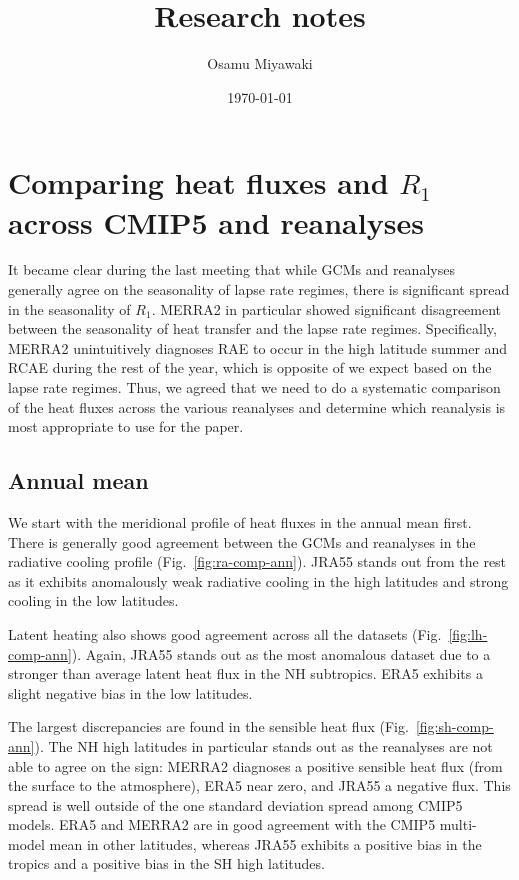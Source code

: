 \documentclass{article}
\title{Research notes}
\date{\today}
\author{Osamu Miyawaki}
\begin{document}
\maketitle

\section{Comparing heat fluxes and $R_1$ across CMIP5 and reanalyses}
It became clear during the last meeting that while GCMs and reanalyses generally agree on the seasonality of lapse rate regimes, there is significant spread in the seasonality of $R_1$. MERRA2 in particular showed significant disagreement between the seasonality of heat transfer and the lapse rate regimes. Specifically, MERRA2 unintuitively diagnoses RAE to occur in the high latitude summer and RCAE during the rest of the year, which is opposite of we expect based on the lapse rate regimes. Thus, we agreed that we need to do a systematic comparison of the heat fluxes across the various reanalyses and determine which reanalysis is most appropriate to use for the paper.

\subsection{Annual mean}
We start with the meridional profile of heat fluxes in the annual mean first. There is generally good agreement between the GCMs and reanalyses in the radiative cooling profile (Fig.~\ref{fig:ra-comp-ann}). JRA55 stands out from the rest as it exhibits anomalously weak radiative cooling in the high latitudes and strong cooling in the low latitudes. 

Latent heating also shows good agreement across all the datasets (Fig.~\ref{fig:lh-comp-ann}). Again, JRA55 stands out as the most anomalous dataset due to a stronger than average latent heat flux in the NH subtropics. ERA5 exhibits a slight negative bias in the low latitudes.

The largest discrepancies are found in the sensible heat flux (Fig.~\ref{fig:sh-comp-ann}). The NH high latitudes in particular stands out as the reanalyses are not able to agree on the sign: MERRA2 diagnoses a positive sensible heat flux (from the surface to the atmosphere), ERA5 near zero, and JRA55 a negative flux. This spread is well outside of the one standard deviation spread among CMIP5 models. ERA5 and MERRA2 are in good agreement with the CMIP5 multi-model mean in other latitudes, whereas JRA55 exhibits a positive bias in the tropics and a positive bias in the SH high latitudes.
\end{document}
